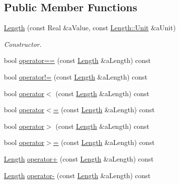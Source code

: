 \subsection*{Public Member Functions}
\begin{DoxyCompactItemize}
\item 
\hyperlink{classlibrary_1_1physics_1_1units_1_1_length_a37acb2579b889c48c526be57208187c6}{Length} (const Real \&a\+Value, const \hyperlink{classlibrary_1_1physics_1_1units_1_1_length_a3b8b39cd245cf6b19dc34459baeccb18}{Length\+::\+Unit} \&a\+Unit)
\begin{DoxyCompactList}\small\item\em Constructor. \end{DoxyCompactList}\item 
bool \hyperlink{classlibrary_1_1physics_1_1units_1_1_length_a28603b499e587fbb266b214aa8e69b2b}{operator==} (const \hyperlink{classlibrary_1_1physics_1_1units_1_1_length}{Length} \&a\+Length) const
\item 
bool \hyperlink{classlibrary_1_1physics_1_1units_1_1_length_ac2c8c35dcfe12ef8950f99f38d923549}{operator!=} (const \hyperlink{classlibrary_1_1physics_1_1units_1_1_length}{Length} \&a\+Length) const
\item 
bool \hyperlink{classlibrary_1_1physics_1_1units_1_1_length_a670a10bebe9e59df7a0d69dbd911ec45}{operator$<$} (const \hyperlink{classlibrary_1_1physics_1_1units_1_1_length}{Length} \&a\+Length) const
\item 
bool \hyperlink{classlibrary_1_1physics_1_1units_1_1_length_a9a12229f143bcec6cfc57e673ee06d5d}{operator$<$=} (const \hyperlink{classlibrary_1_1physics_1_1units_1_1_length}{Length} \&a\+Length) const
\item 
bool \hyperlink{classlibrary_1_1physics_1_1units_1_1_length_a3fb1ddeb86d64b76147d725f6ce219bf}{operator$>$} (const \hyperlink{classlibrary_1_1physics_1_1units_1_1_length}{Length} \&a\+Length) const
\item 
bool \hyperlink{classlibrary_1_1physics_1_1units_1_1_length_ab91577410faa28d0f05bbd576cc68ae8}{operator$>$=} (const \hyperlink{classlibrary_1_1physics_1_1units_1_1_length}{Length} \&a\+Length) const
\item 
\hyperlink{classlibrary_1_1physics_1_1units_1_1_length}{Length} \hyperlink{classlibrary_1_1physics_1_1units_1_1_length_a511e4f9965dc83b505e4339479cd0d4b}{operator+} (const \hyperlink{classlibrary_1_1physics_1_1units_1_1_length}{Length} \&a\+Length) const
\item 
\hyperlink{classlibrary_1_1physics_1_1units_1_1_length}{Length} \hyperlink{classlibrary_1_1physics_1_1units_1_1_length_af34113f000f221058dc48df951c0c861}{operator-\/} (const \hyperlink{classlibrary_1_1physics_1_1units_1_1_length}{Length} \&a\+Length) const

\end{DoxyCompactItemize}
